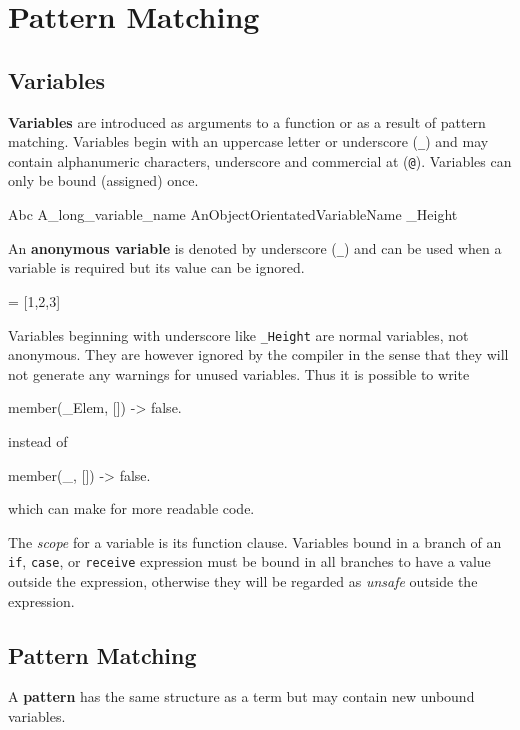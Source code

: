 \chapter{Pattern Matching}
\label{patterns}

\section{Variables}
\label{patterns:variables}

\textbf{Variables} are introduced as arguments to a function or as a
result of pattern matching. Variables begin with an uppercase letter
or underscore (\texttt{\_}) and may contain alphanumeric characters,
underscore and commercial at (\texttt{@}). Variables can only be bound
(assigned) once.

\begin{erlang}
Abc
A_long_variable_name
AnObjectOrientatedVariableName
_Height
\end{erlang}

An \textbf{anonymous variable} is denoted by underscore (\texttt{\_})
and can be used when a variable is required but its value can be
ignored.

\begin{erlang}
[H|_] = [1,2,3]         %
\end{erlang}

Variables beginning with underscore like \texttt{\_Height} are normal
variables, not anonymous. They are however ignored by the compiler in
the sense that they will not generate any warnings for unused
variables. Thus it is possible to write

\begin{erlang}
member(_Elem, []) ->
    false.
\end{erlang}

instead of

\begin{erlang}
member(_, []) ->
    false.
\end{erlang}

which can make for more readable code.

The \textit{scope} for a variable is its function clause. Variables
bound in a branch of an \texttt{if}, \texttt{case}, or
\texttt{receive} expression must be bound in all branches to have a
value outside the expression, otherwise they will be regarded as
\textit{unsafe} outside the expression.


\section{Pattern Matching}
A \textbf{pattern} has the same structure as a term but may contain
new unbound variables.

